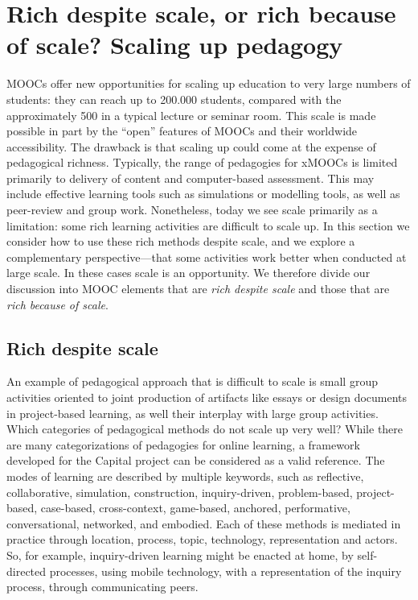 \section{Rich despite scale, or rich because of scale?  Scaling up pedagogy}


MOOCs offer new opportunities for scaling up education to very large
numbers of students:
they can reach up to 200.000 students, compared with the approximately
500 in a typical lecture or seminar room.
This scale is made possible
in part by the ``open'' features of MOOCs and their worldwide
accessibility.
The drawback is that scaling up could come at the
expense of pedagogical richness. Typically, the range of pedagogies for
xMOOCs is limited primarily to delivery of content and computer-based
assessment. This may include effective learning tools such as
simulations or modelling tools, as well as peer-review and group
work. Nonetheless, today we see scale primarily as a limitation: some
rich learning 
activities are difficult to scale up. In this section we consider
how to use these rich methods despite scale, and we explore a
complementary perspective---that some activities work better when conducted at
large scale. In these cases scale is an opportunity.  We therefore
divide our discussion into MOOC elements that are \emph{rich despite
  scale} and those that are \emph{rich because of scale}.

\subsection{Rich despite scale}

An example of pedagogical approach that is difficult to scale is small
group activities oriented to joint production of artifacts like essays
or design documents in project-based learning, as well their interplay
with large group activities. Which categories of pedagogical methods do
not scale up very well? While there are many categorizations of
pedagogies for online learning, a framework developed for the Capital
project can be considered as a valid reference. The modes of learning
are described by multiple keywords, such as reflective, collaborative,
simulation, construction, inquiry-driven, problem-based, project-based,
case-based, cross-context, game-based, anchored, performative,
conversational, networked, and embodied. Each of these methods is
mediated in practice through location, process, topic, technology,
representation and actors. So, for example, inquiry-driven learning
might be enacted at home, by self-directed processes, using mobile technology,
with a representation of the
inquiry process, through communicating peers.

